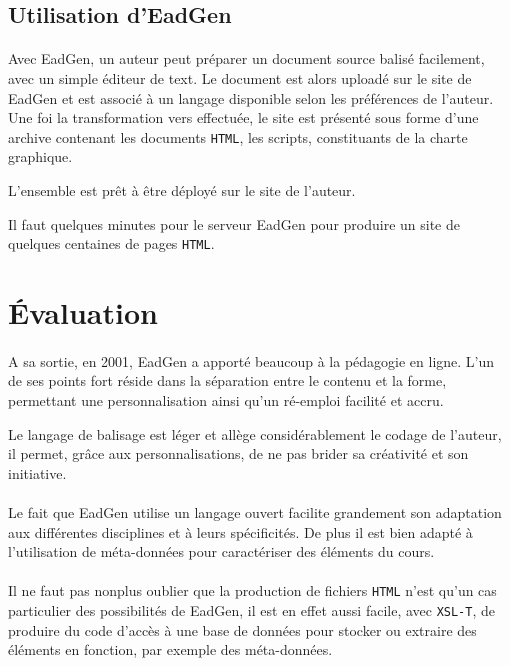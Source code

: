 

\subsection{Utilisation d'EadGen}

\paragraph{}Avec EadGen, un auteur peut préparer un document source balisé facilement, avec un simple éditeur de text. Le document est alors uploadé sur le site de EadGen et est associé à un langage disponible selon les préférences de l'auteur. Une foi la transformation vers effectuée, le site est présenté sous forme d'une archive contenant les documents \texttt{HTML}, les scripts, constituants de la charte graphique. 

L'ensemble est prêt à être déployé sur le site de l'auteur.

Il faut quelques minutes pour le serveur EadGen pour produire un site de quelques centaines de pages \texttt{HTML}.





\section{Évaluation}


\paragraph{}A sa sortie, en 2001, EadGen a apporté beaucoup à la pédagogie en ligne. L'un de ses points fort réside dans la séparation entre le contenu et la forme, permettant une personnalisation ainsi qu'un ré-emploi facilité et accru.


Le langage de balisage est léger et allège considérablement le codage de l'auteur, il permet, grâce aux personnalisations, de ne pas brider sa créativité et son initiative.


\paragraph{}Le fait que EadGen utilise un langage ouvert facilite grandement son adaptation aux différentes disciplines et à leurs spécificités. De plus il est bien adapté à l'utilisation de méta-données pour caractériser des éléments du cours. 


\paragraph{}Il ne faut pas nonplus oublier que la production de fichiers \texttt{HTML} n'est qu'un cas particulier des possibilités de EadGen, il est en effet aussi facile, avec \texttt{XSL-T}, de produire du code d'accès à une base de données pour stocker ou extraire des éléments en fonction, par exemple des méta-données.